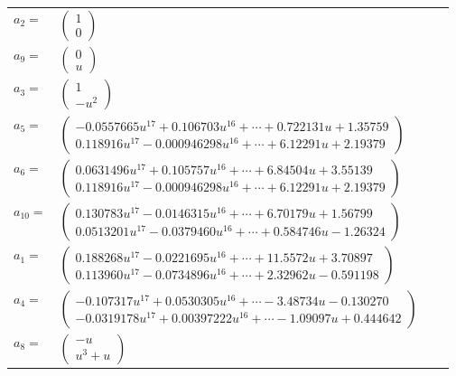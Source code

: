 \documentclass[1p]{elsarticle_modified}
\theoremstyle{definition}
\begin{document}
\begin{tabular}{m{7pt} m{180pt} m{7pt} m{180pt} }
\flushright $a_{2}=$&$\begin{pmatrix}1\\0\end{pmatrix}$ \\
\flushright $a_{9}=$&$\begin{pmatrix}0\\u\end{pmatrix}$ \\
\flushright $a_{3}=$&$\begin{pmatrix}1\\- u^2\end{pmatrix}$ \\
\flushright $a_{5}=$&$\begin{pmatrix}-0.0557665 u^{17}+0.106703 u^{16}+\cdots+0.722131 u+1.35759\\0.118916 u^{17}-0.000946298 u^{16}+\cdots+6.12291 u+2.19379\end{pmatrix}$ \\
\flushright $a_{6}=$&$\begin{pmatrix}0.0631496 u^{17}+0.105757 u^{16}+\cdots+6.84504 u+3.55139\\0.118916 u^{17}-0.000946298 u^{16}+\cdots+6.12291 u+2.19379\end{pmatrix}$ \\
\flushright $a_{10}=$&$\begin{pmatrix}0.130783 u^{17}-0.0146315 u^{16}+\cdots+6.70179 u+1.56799\\0.0513201 u^{17}-0.0379460 u^{16}+\cdots+0.584746 u-1.26324\end{pmatrix}$ \\
\flushright $a_{1}=$&$\begin{pmatrix}0.188268 u^{17}-0.0221695 u^{16}+\cdots+11.5572 u+3.70897\\0.113960 u^{17}-0.0734896 u^{16}+\cdots+2.32962 u-0.591198\end{pmatrix}$ \\
\flushright $a_{4}=$&$\begin{pmatrix}-0.107317 u^{17}+0.0530305 u^{16}+\cdots-3.48734 u-0.130270\\-0.0319178 u^{17}+0.00397222 u^{16}+\cdots-1.09097 u+0.444642\end{pmatrix}$ \\
\flushright $a_{8}=$&$\begin{pmatrix}- u\\u^3+u\end{pmatrix}$ \\

\end{tabular}
\end{document}
